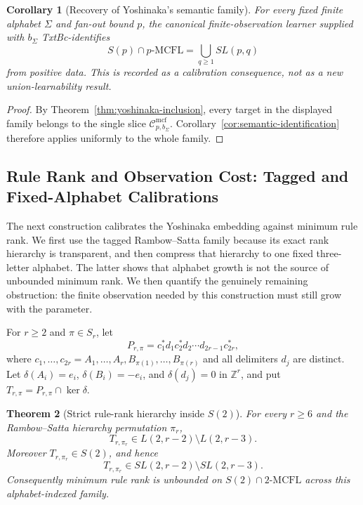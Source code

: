 \documentclass[11pt,a4paper]{article}
\numberwithin{equation}{section}
\theoremstyle{plain}
\newtheorem{theorem}{Theorem}[section]
\newtheorem{corollary}[theorem]{Corollary}
\theoremstyle{definition}
\theoremstyle{remark}
\newcommand{\Cmcf}[2]{\mathcal{C}^{\mathrm{mcf}}_{#1,#2}}
\begin{document}
\begin{corollary}[Recovery of Yoshinaka's semantic family]
\label{cor:yoshinaka-full-union-learning}
For every fixed finite alphabet $\Sigma$ and fan-out bound $p$, the canonical
finite-observation learner supplied with $b_\Sigma$ TxtBc-identifies
\[
  S(p)\cap p\text{-}\mathrm{MCFL}
  =\bigcup_{q\ge1}SL(p,q)
\]
from positive data.  This is recorded as a calibration consequence, not as a
new union-learnability result.
\end{corollary}

\begin{proof}
By Theorem~\ref{thm:yoshinaka-inclusion}, every target in the displayed family
belongs to the single slice $\Cmcf{p}{b_\Sigma}$.  Corollary~\ref{cor:semantic-identification}
therefore applies uniformly to the whole family.
\end{proof}

\subsection{Rule Rank and Observation Cost: Tagged and Fixed-Alphabet Calibrations}
\label{subsec:rank-observation-calibration}

The next construction calibrates the Yoshinaka embedding against minimum rule
rank.  We first use the tagged Rambow--Satta family because its exact rank
hierarchy is transparent, and then compress that hierarchy to one fixed
three-letter alphabet.  The latter shows that alphabet growth is not the
source of unbounded minimum rank.  We then quantify the genuinely remaining
obstruction: the finite observation needed by this construction must still
grow with the parameter.

For $r\ge2$ and $\pi\in S_r$, let
\[
 P_{r,\pi}=c_1^*d_1c_2^*d_2\cdots d_{2r-1}c_{2r}^*,
\]
where
$c_1,\ldots,c_{2r}=A_1,\ldots,A_r,B_{\pi(1)},\ldots,B_{\pi(r)}$
and all delimiters $d_j$ are distinct.  Let
$\delta(A_i)=e_i$, $\delta(B_i)=-e_i$, and $\delta(d_j)=0$ in $\mathbb Z^r$,
and put $T_{r,\pi}=P_{r,\pi}\cap\ker\delta$.

\begin{theorem}[Strict rule-rank hierarchy inside $S(2)$]
\label{thm:s2-rank-hierarchy}
For every $r\ge6$ and the Rambow--Satta hierarchy permutation $\pi_r$,
\[
  T_{r,\pi_r}\in L(2,r-2)\setminus L(2,r-3).
\]
Moreover $T_{r,\pi_r}\in S(2)$, and hence
\[
  T_{r,\pi_r}\in SL(2,r-2)\setminus SL(2,r-3).
\]
Consequently minimum rule rank is unbounded on
$S(2)\cap2\text{-}\mathrm{MCFL}$ across this alphabet-indexed family.
\end{theorem}
\end{document}
